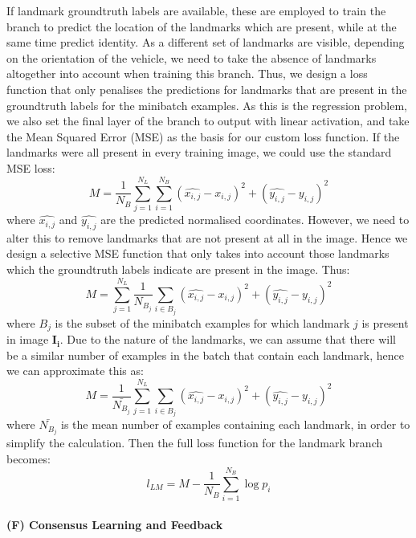 \documentclass[10pt,twocolumn,letterpaper]{article}
\begin{document}
If landmark groundtruth labels are available, these are employed to train the branch to predict the location of the landmarks which are present, while at the same time predict identity. As a different set of landmarks are visible, depending on the orientation of the vehicle, we need to take the absence of landmarks altogether into account when training this branch. Thus, we design a loss function that only penalises the predictions for landmarks that are present in the groundtruth labels for the minibatch examples. As this is the regression problem, we also set the final layer of the branch to output with linear activation, and take the Mean Squared Error (MSE) as the basis for our custom loss function. If the landmarks were all present in every training image, we could use the standard MSE loss:
\begin{equation}
  M = \frac{1}{N_B} \sum_{j=1}^{N_L} \sum_{i=1}^{N_B} (\hat{x_{i,j}} - x_{i,j})^2 + (\hat{y_{i,j}} - y_{i,j})^2
\end{equation}
where $\hat{x_{i,j}}$ and $\hat{y_{i,j}}$ are the predicted normalised coordinates. However, we need to alter this to remove landmarks that are not present at all in the image. Hence we design a selective MSE function that only takes into account those landmarks which the groundtruth labels indicate are present in the image. Thus:
\begin{equation}
  M = \sum_{j=1}^{N_L} \frac{1}{N_{B_j}} \sum_{i \in B_j} (\hat{x_{i,j}} - x_{i,j})^2 + (\hat{y_{i,j}} - y_{i,j})^2 
\end{equation}
where $B_j$ is the subset of the minibatch examples for which landmark $j$ is present in image $\mathbf{I_i}$. Due to the nature of the landmarks, we can assume that there will be a similar number of examples in the batch that contain each landmark, hence we can approximate this as:
\begin{equation}
  M = \frac{1}{\bar{N_{B_j}}} \sum_{j=1}^{N_L}  \sum_{i \in B_j} (\hat{x_{i,j}} - x_{i,j})^2 + (\hat{y_{i,j}} - y_{i,j})^2 
\end{equation}
where $\bar{N_{B_j}}$ is the mean number of examples containing each landmark, in order to simplify the calculation. Then the full loss function for the landmark branch becomes:
\begin{equation}
  l_{LM} = M - \frac{1}{N_B} \sum_{i=1}^{N_B} \log{p_i}
\end{equation}

\paragraph{(F) Consensus Learning and Feedback}
\end{document}
